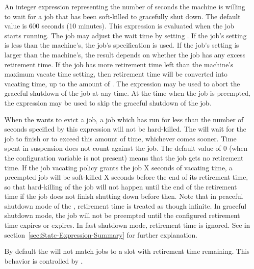 \begin{description}
\label{param:MachineMaxVacateTime}
\item[\Macro{MachineMaxVacateTime}] An integer expression representing
  the number of seconds the machine is willing to wait for a job that
  has been soft-killed to gracefully shut down.  The default value is
  600 seconds (10 minutes).  This expression is evaluated when the job
  starts running.  The job may adjust the wait time by setting
  .  If the job's setting is less than the
  machine's, the job's specification is used.  
  If the job's setting is larger than the machine's,
  the result depends on whether the job has any excess
  retirement time.  If the job has more retirement time left than the
  machine's maximum vacate time setting, then retirement time will be
  converted into vacating time, up to the amount of
  .  The  expression may be used
  to abort the graceful shutdown of the job at any time.  At the time
  when the job is preempted, the  expression may
  be used to skip the graceful shutdown of the job.

\label{param:MaxJobRetirementTime}
\item[\Macro{MAXJOBRETIREMENTTIME}]
  When the  wants to evict a job, a job which has run
  for less than the number of seconds specified by this expression
  will not be hard-killed.  The  will wait for the job to
  finish or to exceed this amount of time, whichever comes sooner.
  Time spent in suspension does not count against the job.
  The default value of 0
  (when the configuration variable is not present) means that the job
  gets no retirement time.  If the job vacating policy grants the job
  X seconds of vacating time, a preempted job will be soft-killed X seconds
  before the end of its retirement time, so that hard-killing of the job
  will not happen until the end of the retirement time if the job does
  not finish shutting down before then.
  Note that in peaceful shutdown mode of the
  , retirement time is treated as though infinite.
  In graceful shutdown mode, the job will not be preempted until the
  configured retirement time expires or 
  expires.  In fast shutdown mode, retirement time is ignored.  See
   in
  section~\ref{sec:State-Expression-Summary} for further explanation.

  By default the  will not match jobs to a slot with
  retirement time remaining.  This behavior is controlled by
  .


\end{description}

